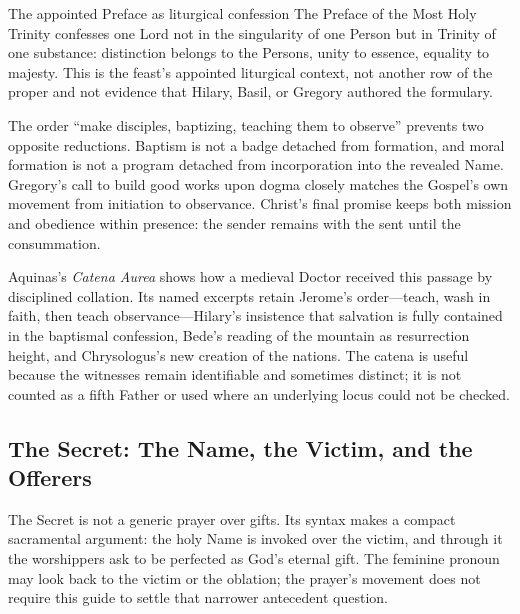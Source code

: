 \begin{deepstudy}
\begin{massbox}{The appointed Preface as liturgical confession}
The Preface of the Most Holy Trinity confesses one Lord not in the singularity of one Person but in Trinity of one substance: distinction belongs to the Persons, unity to essence, equality to majesty. This is the feast's appointed liturgical context, not another row of the proper and not evidence that Hilary, Basil, or Gregory authored the formulary.
\end{massbox}

The order ``make disciples, baptizing, teaching them to observe'' prevents two opposite reductions. Baptism is not a badge detached from formation, and moral formation is not a program detached from incorporation into the revealed Name. Gregory's call to build good works upon dogma closely matches the Gospel's own movement from initiation to observance. Christ's final promise keeps both mission and obedience within presence: the sender remains with the sent until the consummation.

Aquinas's \emph{Catena Aurea} shows how a medieval Doctor received this passage by disciplined collation. Its named excerpts retain Jerome's order---teach, wash in faith, then teach observance---Hilary's insistence that salvation is fully contained in the baptismal confession, Bede's reading of the mountain as resurrection height, and Chrysologus's new creation of the nations. The catena is useful because the witnesses remain identifiable and sometimes distinct; it is not counted as a fifth Father or used where an underlying locus could not be checked.

\sectionguard
\subsection*{The Secret: The Name, the Victim, and the Offerers\enspace{}}

The Secret is not a generic prayer over gifts. Its syntax makes a compact sacramental argument: the holy Name is invoked over the victim, and through it the worshippers ask to be perfected as God's eternal gift. The feminine pronoun  may look back to the victim or the oblation; the prayer's movement does not require this guide to settle that narrower antecedent question.


\end{deepstudy}
